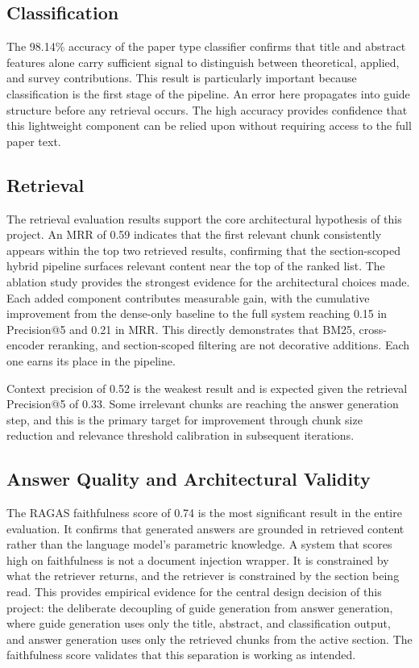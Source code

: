 \documentclass[12pt,a4paper]{report}
\begin{document}
\subsection*{Classification}
The 98.14\% accuracy of the paper type classifier confirms that title and
abstract features alone carry sufficient signal to distinguish between
theoretical, applied, and survey contributions. This result is particularly
important because classification is the first stage of the pipeline. An error
here propagates into guide structure before any retrieval occurs. The high
accuracy provides confidence that this lightweight component can be relied upon
without requiring access to the full paper text.

\subsection*{Retrieval}
The retrieval evaluation results support the core architectural hypothesis of
this project. An MRR of 0.59 indicates that the first relevant chunk
consistently appears within the top two retrieved results, confirming that the
section-scoped hybrid pipeline surfaces relevant content near the top of the
ranked list. The ablation study provides the strongest evidence for the
architectural choices made. Each added component contributes measurable gain,
with the cumulative improvement from the dense-only baseline to the full system
reaching 0.15 in Precision@5 and 0.21 in MRR. This directly demonstrates that
BM25, cross-encoder reranking, and section-scoped filtering are not decorative
additions. Each one earns its place in the pipeline.

Context precision of 0.52 is the weakest result and is expected given the
retrieval Precision@5 of 0.33. Some irrelevant chunks are reaching the answer
generation step, and this is the primary target for improvement through chunk
size reduction and relevance threshold calibration in subsequent iterations.

\subsection*{Answer Quality and Architectural Validity}
The RAGAS faithfulness score of 0.74 is the most significant result in the
entire evaluation. It confirms that generated answers are grounded in retrieved
content rather than the language model's parametric knowledge. A system that
scores high on faithfulness is not a document injection wrapper. It is
constrained by what the retriever returns, and the retriever is constrained by
the section being read. This provides empirical evidence for the central design
decision of this project: the deliberate decoupling of guide generation from
answer generation, where guide generation uses only the title, abstract, and
classification output, and answer generation uses only the retrieved chunks from
the active section. The faithfulness score validates that this separation is
working as intended.
\end{document}
